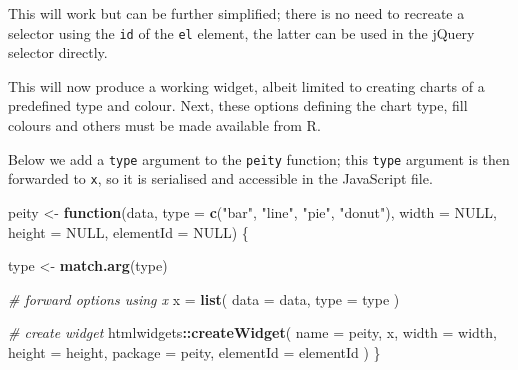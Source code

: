 \documentclass[
]{krantz}
\makeatletter
\newenvironment{Shaded}{\begin{snugshade}}{\end{snugshade}}
\newcommand{\AttributeTok}[1]{\textcolor[rgb]{0.61,0.61,0.61}{#1}}
\newcommand{\CommentTok}[1]{\textcolor[rgb]{0.37,0.37,0.37}{\textit{#1}}}
\newcommand{\ControlFlowTok}[1]{\textcolor[rgb]{0.27,0.27,0.27}{\textbf{#1}}}
\newcommand{\DataTypeTok}[1]{\textcolor[rgb]{0.27,0.27,0.27}{#1}}
\newcommand{\KeywordTok}[1]{\textcolor[rgb]{0.27,0.27,0.27}{\textbf{#1}}}
\newcommand{\NormalTok}[1]{#1}
\newcommand{\OperatorTok}[1]{\textcolor[rgb]{0.43,0.43,0.43}{\textbf{#1}}}
\newcommand{\OtherTok}[1]{\textcolor[rgb]{0.37,0.37,0.37}{#1}}
\newcommand{\StringTok}[1]{\textcolor[rgb]{0.5,0.5,0.5}{#1}}
\newenvironment{kframe}{%
\medskip{}
\setlength{\fboxsep}{.8em}
 \def\at@end@of@kframe{}%
 \ifinner\ifhmode%
  \def\at@end@of@kframe{\end{minipage}}%
  \begin{minipage}{\columnwidth}%
 \fi\fi%
 \def\FrameCommand##1{\hskip\@totalleftmargin \hskip-\fboxsep
 \colorbox{shadecolor}{##1}\hskip-\fboxsep
     \hskip-\linewidth \hskip-\@totalleftmargin \hskip\columnwidth}%
 \MakeFramed {\advance\hsize-\width
   \@totalleftmargin\z@ \linewidth\hsize
   \@setminipage}}%
 {\par\unskip\endMakeFramed%
 \at@end@of@kframe}
\renewenvironment{Shaded}{\begin{kframe}}{\end{kframe}}
\makeatother
\begin{document}
This will work but can be further simplified; there is no need to recreate a selector using the \texttt{id} of the \texttt{el} element, the latter can be used in the jQuery selector directly.

\begin{Shaded}
\end{Shaded}

This will now produce a working widget, albeit limited to creating charts of a predefined type and colour. Next, these options defining the chart type, fill colours and others must be made available from R.

Below we add a \texttt{type} argument to the \texttt{peity} function; this \texttt{type} argument is then forwarded to \texttt{x}, so it is serialised and accessible in the JavaScript file.

\begin{Shaded}
\begin{Highlighting}[]
\NormalTok{peity <{-}}\StringTok{ }\ControlFlowTok{function}\NormalTok{(data, }\DataTypeTok{type =} \KeywordTok{c}\NormalTok{(}\StringTok{"bar"}\NormalTok{, }\StringTok{"line"}\NormalTok{, }\StringTok{"pie"}\NormalTok{, }\StringTok{"donut"}\NormalTok{), }
  \DataTypeTok{width =} \OtherTok{NULL}\NormalTok{, }\DataTypeTok{height =} \OtherTok{NULL}\NormalTok{, }\DataTypeTok{elementId =} \OtherTok{NULL}\NormalTok{) \{}

\NormalTok{  type <{-}}\StringTok{ }\KeywordTok{match.arg}\NormalTok{(type)}

  \CommentTok{\# forward options using x}
\NormalTok{  x =}\StringTok{ }\KeywordTok{list}\NormalTok{(}
    \DataTypeTok{data =}\NormalTok{ data,}
    \DataTypeTok{type =}\NormalTok{ type}
\NormalTok{  )}

  \CommentTok{\# create widget}
\NormalTok{  htmlwidgets}\OperatorTok{::}\KeywordTok{createWidget}\NormalTok{(}
    \DataTypeTok{name =} \StringTok{\textquotesingle{}peity\textquotesingle{}}\NormalTok{,}
\NormalTok{    x,}
    \DataTypeTok{width =}\NormalTok{ width,}
    \DataTypeTok{height =}\NormalTok{ height,}
    \DataTypeTok{package =} \StringTok{\textquotesingle{}peity\textquotesingle{}}\NormalTok{,}
    \DataTypeTok{elementId =}\NormalTok{ elementId}
\NormalTok{  )}
\NormalTok{\}}
\end{Highlighting}
\end{Shaded}
\end{document}
